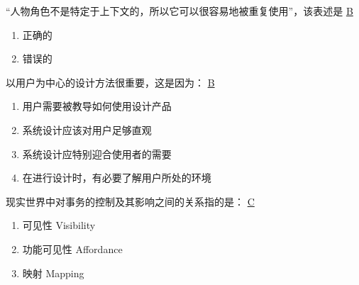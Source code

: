 \begin{problem}
	``人物角色不是特定于上下文的，所以它可以很容易地被重复使用”，该表述是
	\uline{B}    
    \vspace{-0.8em}
    \begin{multicols}{2}
        \begin{enumerate}[label=\Alph*.]
            \item 正确的
            \item 错误的
        \end{enumerate}
    \end{multicols}
    \vspace{-1em}
\end{problem}



\begin{problem}
	以用户为中心的设计方法很重要，这是因为：
	\uline{B}    
    \vspace{-0.8em}
    \begin{multicols}{2}
        \begin{enumerate}[label=\Alph*.]
            \item 用户需要被教导如何使用设计产品
            \item 系统设计应该对用户足够直观
            \item 系统设计应特别迎合使用者的需要
            \item 在进行设计时，有必要了解用户所处的环境
        \end{enumerate}
    \end{multicols}
    \vspace{-1em}
\end{problem}



\begin{problem}
	现实世界中对事务的控制及其影响之间的关系指的是：
	\uline{C}    
    \vspace{-0.8em}
    \begin{multicols}{3}
        \begin{enumerate}[label=\Alph*.]
            \item 可见性 Visibility
            \item 功能可见性 Affordance
            \item 映射 Mapping
        \end{enumerate}
    \end{multicols}
    \vspace{-1em}
\end{problem}



